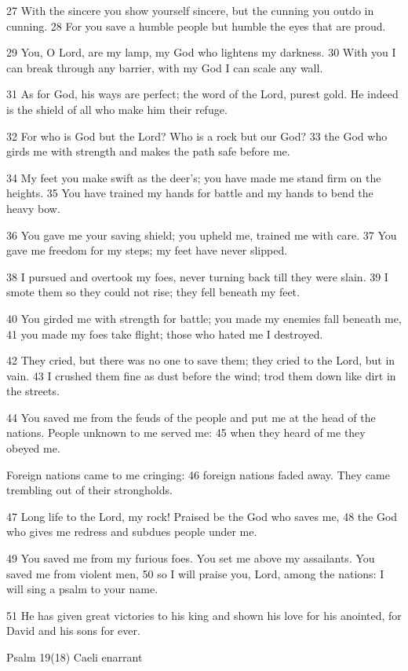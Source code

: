 27 With the sincere you show yourself sincere,
but the cunning you outdo in cunning.
28 For you save a humble people
but humble the eyes that are proud.

29 You, O Lord, are my lamp,
my God who lightens my darkness.
30 With you I can break through any barrier,
with my God I can scale any wall.

31 As for God, his ways are perfect;
the word of the Lord, purest gold.
He indeed is the shield
of all who make him their refuge.

32 For who is God but the Lord?
Who is a rock but our God?
33 the God who girds me with strength
and makes the path safe before me.

34 My feet you make swift as the deer's;
you have made me stand firm on the heights.
35 You have trained my hands for battle
and my hands to bend the heavy bow.

36 You gave me your saving shield;
you upheld me, trained me with care.
37 You gave me freedom for my steps;
my feet have never slipped.

38 I pursued and overtook my foes,
never turning back till they were slain.
39 I smote them so they could not rise;
they fell beneath my feet.

40 You girded me with strength for battle;
you made my enemies fall beneath me,
41 you made my foes take flight;
those who hated me I destroyed.

42 They cried, but there was no one to save them;
they cried to the Lord, but in vain.
43 I crushed them fine as dust before the wind;
trod them down like dirt in the streets.

44 You saved me from the feuds of the people
and put me at the head of the nations.
People unknown to me served me:
45 when they heard of me they obeyed me.

Foreign nations came to me cringing:
46 foreign nations faded away.
They came trembling out of their strongholds.

47 Long life to the Lord, my rock!
Praised be the God who saves me,
48 the God who gives me redress
and subdues people under me.

49 You saved me from my furious foes.
You set me above my assailants.
You saved me from violent men,
50 so I will praise you, Lord, among the nations:
I will sing a psalm to your name.

51 He has given great victories to his king
and shown his love for his anointed,
for David and his sons for ever.


Psalm 19(18) Caeli enarrant

